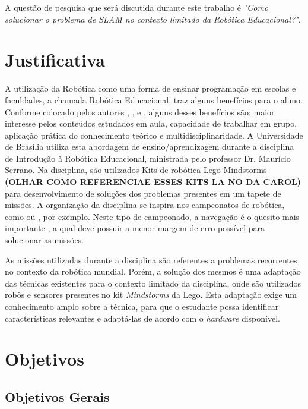 	A questão de pesquisa que será discutida durante este trabalho é \textit{"Como solucionar o problema de SLAM no contexto limitado da Robótica Educacional?"}.

\section{Justificativa}

	A utilização da Robótica como uma forma de ensinar programação em escolas e faculdades, a chamada Robótica Educacional, traz alguns benefícios para o aluno. Conforme colocado pelos autores \cite{teachingWithRoboticKit}, \cite{roboticEducationBasedLego}, \cite{evaluationRoboticEducationScale} e \cite{roboticaEducacionalAulasMatematica}, alguns desses benefícios são: maior interesse pelos conteúdos estudados em aula, capacidade de trabalhar em grupo, aplicação prática do conhecimento teórico e multidisciplinaridade. A Universidade de Brasília utiliza esta abordagem de ensino/aprendizagem durante a disciplina de Introdução à Robótica Educacional, ministrada pelo professor Dr. Maurício Serrano. Na disciplina, são utilizados Kits de robótica Lego Mindstorms \textbf{(OLHAR COMO REFERENCIAE ESSES KITS LA NO DA CAROL)} para desenvolvimento de soluções dos problemas presentes em um tapete de missões. A organização da disciplina se inspira nos campeonatos de robótica, como \cite{ciber-rato} ou \cite{roboBulldozerIV}, por exemplo. Neste tipo de campeonado, a navegação é o quesito mais importante \cite{ciber-rato}, a qual deve possuir a menor margem de erro possível para solucionar as missões.

	As missões utilizadas durante a disciplina são referentes a problemas recorrentes no contexto da robótica mundial. Porém, a solução dos mesmos é uma adaptação das técnicas existentes para o contexto limitado da disciplina, onde são utilizados robôs e sensores presentes no kit \textit{Mindstorms} da Lego. Esta adaptação exige um conhecimento amplo sobre a técnica, para que o estudante possa identificar características relevantes e adaptá-las de acordo com o \textit{hardware} disponível.  

	\section{Objetivos}

	\subsection{Objetivos Gerais} %
	\label{sub:objetivos_gerais}
	
